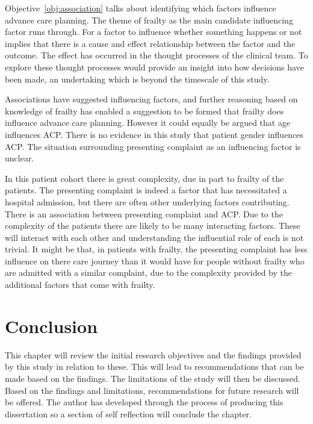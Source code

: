 \documentclass
[
	12pt,
	a4paper,
	oneside,
]{report}
\begin{document}
Objective~\ref{obj:association} talks about identifying which factors 
influence advance care planning.
The theme of frailty as the main candidate influencing factor runs through.
For a factor to influence whether something happens or not implies that there 
is a cause and effect relationship between the factor and the outcome. 
The effect has occurred in the thought processes of the clinical team. To 
explore these thought processes would provide an insight into how decisions
have been made, an undertaking which is beyond the timescale of this study.

Associations have suggested influencing factors, and further reasoning based
on knowledge of frailty has enabled a suggestion to be formed that frailty
does influence advance care planning. However it could equally be argued
that age influences ACP. There is no evidence in this study that patient
gender influences ACP. The situation surrounding presenting complaint as
an influencing factor is unclear.

In this patient cohort there is great complexity, due in part to frailty
of the patients. The presenting complaint is indeed a factor that has 
necessitated a hospital admission, but there are often other underlying
factors contributing. There is an association between presenting complaint
and ACP. Due to the complexity of the patients there are likely to be many
interacting factors. These will interact with each other and understanding
the influential role of each is not trivial.
It might be that, in patients with
frailty, the presenting complaint has less influence on there care journey than
it would have for people without frailty who are admitted with a similar
complaint, due to the complexity provided by the additional factors that
come with frailty.



\chapter{Conclusion}

This chapter will review the initial research objectives and the findings
provided by this study in relation to these. 
This will lead to recommendations that can be made based on the findings. The
limitations of the study will then be discussed. Based on the findings and 
limitations, recommendations for future research will be offered. The author
has developed through the process of producing this dissertation so a section
of self reflection will conclude the chapter.
\end{document}
